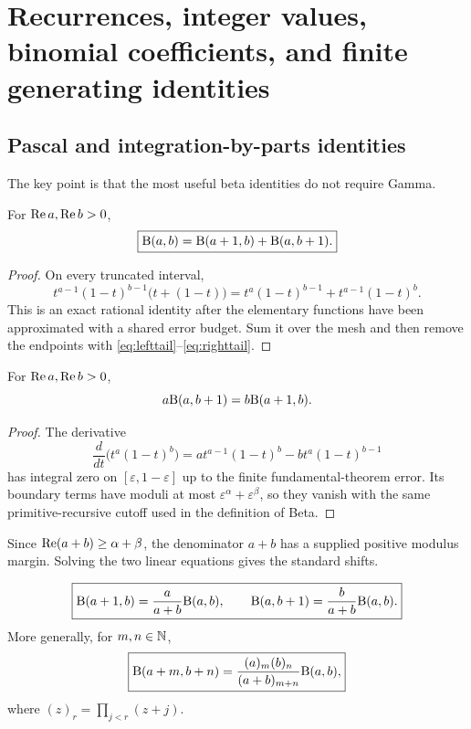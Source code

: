 \section{Recurrences, integer values, binomial coefficients, and finite generating identities}
\label{sec:elementary}

\subsection{Pascal and integration-by-parts identities}

The key point is that the most useful beta identities do not require Gamma.

\begin{theorem}\label{thm:pascal}
For $\operatorname{Re} a,\operatorname{Re} b>0$,
\[
 \boxed{\mathrm B(a,b)=\mathrm B(a+1,b)+\mathrm B(a,b+1).}
\]
\end{theorem}

\begin{proof}
On every truncated interval,
\[
 t^{a-1}(1-t)^{b-1}\bigl(t+(1-t)\bigr)
 =t^a(1-t)^{b-1}+t^{a-1}(1-t)^b.
\]
This is an exact rational identity after the elementary functions have been approximated with a shared error budget.  Sum it over the mesh and then remove the endpoints with \eqref{eq:lefttail}--\eqref{eq:righttail}.
\end{proof}

\begin{lemma}\label{lem:balanced-ibp}
For $\operatorname{Re} a,\operatorname{Re} b>0$,
\[
 a\mathrm B(a,b+1)=b\mathrm B(a+1,b).
\]
\end{lemma}

\begin{proof}
The derivative
\[
 \frac{d}{dt}\bigl(t^a(1-t)^b\bigr)
 =a t^{a-1}(1-t)^b-bt^a(1-t)^{b-1}
\]
has integral zero on $[\varepsilon,1-\varepsilon]$ up to the finite fundamental-theorem error.  Its boundary terms have moduli at most $\varepsilon^\alpha+\varepsilon^\beta$, so they vanish with the same primitive-recursive cutoff used in the definition of Beta.
\end{proof}

Since $\operatorname{Re}(a+b)\ge\alpha+\beta$, the denominator $a+b$ has a supplied positive modulus margin.  Solving the two linear equations gives the standard shifts.

\begin{corollary}\label{cor:coordinate-recurrence}
\[
 \boxed{\mathrm B(a+1,b)=\frac{a}{a+b}\mathrm B(a,b),\qquad
 \mathrm B(a,b+1)=\frac{b}{a+b}\mathrm B(a,b).}
\]
More generally, for $m,n\in\mathbb N$,
\[
 \boxed{\mathrm B(a+m,b+n)=
 \frac{(a)_m(b)_n}{(a+b)_{m+n}}\mathrm B(a,b),}
\]
where $(z)_r=\prod_{j<r}(z+j)$.
\end{corollary}


